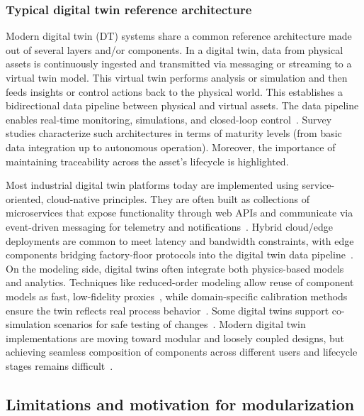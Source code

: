 \subsubsection{Typical digital twin reference architecture}
Modern digital twin (DT) systems share a common reference architecture made out of several layers and/or components. In a digital twin, data from physical assets is continuously ingested and transmitted via messaging or streaming to a virtual twin model. This virtual twin performs analysis or simulation and then feeds insights or control actions back to the physical world. This establishes a bidirectional data pipeline between physical and virtual assets. The data pipeline enables real-time monitoring, simulations, and closed-loop control~\cite{shao2020framework, jones2020characterising, soori2023digital}. Survey studies characterize such architectures in terms of maturity levels (from basic data integration up to autonomous operation). Moreover, the importance of maintaining traceability across the asset’s lifecycle is highlighted.

Most industrial digital twin platforms today are implemented using service-oriented, cloud-native principles. They are often built as collections of microservices that expose functionality through web APIs and communicate via event-driven messaging for telemetry and notifications~\cite{Fielding2000REST}. Hybrid cloud/edge deployments are common to meet latency and bandwidth constraints, with edge components bridging factory-floor protocols into the digital twin data pipeline~\cite{shao2020framework, soori2023digital}. On the modeling side, digital twins often integrate both physics-based models and analytics. Techniques like reduced-order modeling allow reuse of component models as fast, low-fidelity proxies~\cite{Kapteyn2020}, while domain-specific calibration methods ensure the twin reflects real process behavior~\cite{zheng2020quality, wang2021assembly}. Some digital twins support co-simulation scenarios for safe testing of changes~\cite{schluse2017experimentable}. Modern digital twin implementations are moving toward modular and loosely coupled designs, but achieving seamless composition of components across different users and lifecycle stages remains difficult~\cite{Liu2024DTMMReview, jones2020characterising}.

\subsection{Limitations and motivation for modularization}
